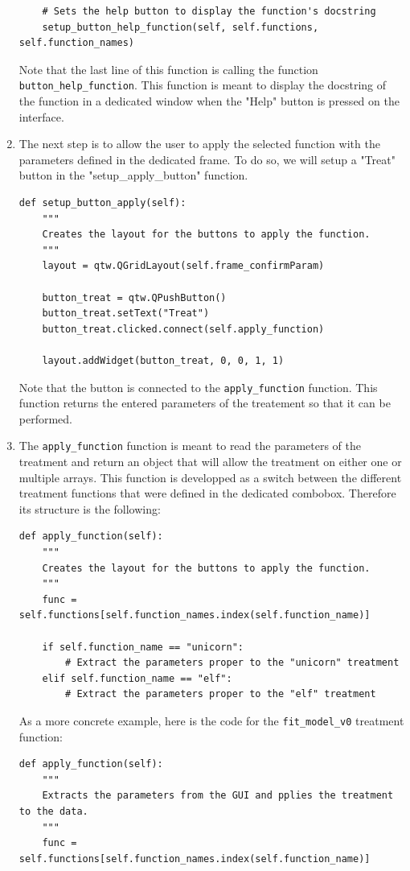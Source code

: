 \documentclass[a4paper,12pt]{article}
\begin{document}
\begin{enumerate}
\begin{lstlisting}
    # Sets the help button to display the function's docstring
    setup_button_help_function(self, self.functions, self.function_names)
\end{lstlisting}
        Note that the last line of this function is calling the function \texttt{button\_help\_function}. This function is meant to display the docstring of the function in a dedicated window when the "Help" button is pressed on the interface.
        \item The next step is to allow the user to apply the selected function with the parameters defined in the dedicated frame. To do so, we will setup a "Treat" button in the "setup\_apply\_button" function. 
\begin{lstlisting}
def setup_button_apply(self):
    """
    Creates the layout for the buttons to apply the function.
    """
    layout = qtw.QGridLayout(self.frame_confirmParam)

    button_treat = qtw.QPushButton()
    button_treat.setText("Treat")
    button_treat.clicked.connect(self.apply_function)

    layout.addWidget(button_treat, 0, 0, 1, 1)
\end{lstlisting}
        Note that the button is connected to the \texttt{apply\_function} function. This function returns the entered parameters of the treatement so that it can be performed.
        \item The \texttt{apply\_function} function is meant to read the parameters of the treatment and return an object that will allow the treatment on either one or multiple arrays. This function is developped as a switch between the different treatment functions that were defined in the dedicated combobox. Therefore its structure is the following:
\begin{lstlisting}
def apply_function(self):
    """
    Creates the layout for the buttons to apply the function.
    """
    func = self.functions[self.function_names.index(self.function_name)]

    if self.function_name == "unicorn":
        # Extract the parameters proper to the "unicorn" treatment
    elif self.function_name == "elf":
        # Extract the parameters proper to the "elf" treatment
\end{lstlisting}
        As a more concrete example, here is the code for the \texttt{fit\_model\_v0} treatment function:
\begin{lstlisting}
def apply_function(self):
    """
    Extracts the parameters from the GUI and pplies the treatment to the data.
    """
    func = self.functions[self.function_names.index(self.function_name)]


\end{lstlisting}
\end{enumerate}
\end{document}
